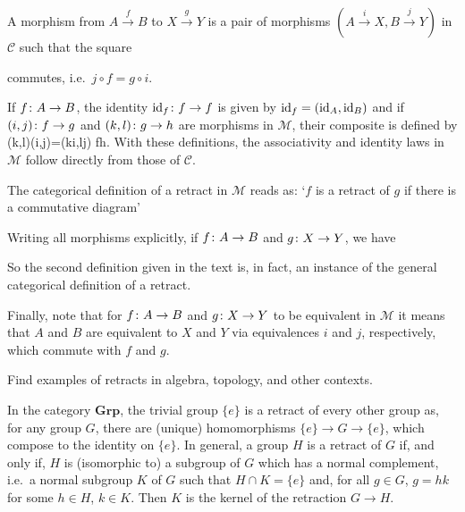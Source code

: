 A morphism from $A\xrightarrow{f}B$ to $X\xrightarrow{g}Y$ is a pair of morphisms $(A\xrightarrow{i}X,B\xrightarrow{j}Y)$ in $\mathcal{C}$ such that the square
\bse
{}
\ese
commutes, i.e.\ $j\circ f=g\circ i$.

If $f\colon A\to B$, the identity $\mathrm{id}_f\colon f\to f$ is given by $\mathrm{id}_f=(\mathrm{id}_A,\mathrm{id}_B)$ and if $(i,j)\colon f\to g$ and $(k,l)\colon g\to h$ are morphisms in $\mathcal{M}$, their composite is defined by
\bse
(k,l)\circ (i,j)=(k\circ i,l\circ j) \cl f\to h.
\ese
With these definitions, the associativity and identity laws in $\mathcal{M}$ follow directly from those of $\mathcal{C}$.

The categorical definition of a retract in $\mathcal{M}$ reads as: `$f$ is a retract of $g$ if there is a commutative diagram'
\bse
{}
\ese
Writing all morphisms explicitly, if $f\colon A\to B$ and $g\colon X\to Y$, we have
\bse
{}
\ese
So the second definition given in the text is, in fact, an instance of the general categorical definition of a retract.

Finally, note that for $f\colon A\to B$ and $g\colon X\to Y$ to be equivalent in $\mathcal{M}$ it means that $A$ and $B$ are equivalent to $X$ and $Y$ via equivalences $i$ and $j$, respectively, which commute with $f$ and $g$.
\es

\bx
Find examples of retracts in algebra, topology, and other contexts.
\ex

\bs
In the category $\mathbf{Grp}$, the trivial group $\{e\}$ is a retract of every other group as, for any group $G$, there are (unique) homomorphisms $\{e\} \to G \to \{e\}$, which compose to the identity on $\{e\}$. In general, a group $H$ is a retract of $G$ if, and only if, $H$ is (isomorphic to) a subgroup of $G$ which has a normal complement, i.e.\ a normal subgroup $K$ of $G$ such that $H\cap K=\{e\}$ and, for all $g\in G$, $g=hk$ for some $h\in H$, $k\in K$. Then $K$ is the kernel of the retraction $G\to H$.

